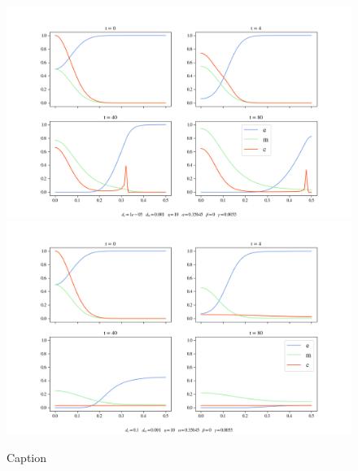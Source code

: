 \begin{figure}[h]
    \centering
    \includegraphics[width=\textwidth]{resources/images/2D_10e-6_1e-3_1e-3_10_0.35645_0_0.0055_1e-2_10_plot.png}
    \includegraphics[width=\textwidth]{resources/images/2D_1e-1_1e-3_1e-3_10_0.35645_0_0.0055_1e-2_10_plot.png}
    \caption{Caption}
    \label{fig:dc_comparison}
\end{figure}

